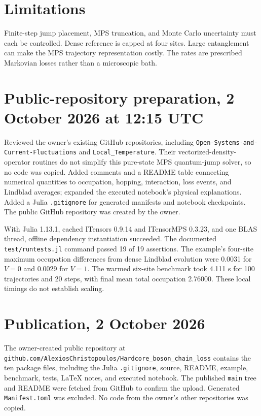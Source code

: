 \documentclass[11pt]{article}
\begin{document}
\section*{Limitations}
Finite-step jump placement, MPS truncation, and Monte Carlo uncertainty
must each be controlled. Dense reference is capped at four sites.
Large entanglement can make the MPS trajectory representation costly.
The rates are prescribed Markovian losses rather than a microscopic bath.
\section*{Public-repository preparation, 2 October 2026 at 12:15 UTC}
Reviewed the owner's existing GitHub repositories, including
\texttt{Open-Systems-and-Current-Fluctuations} and
\texttt{Local\_Temperature}. Their vectorized-density-operator routines
do not simplify this pure-state MPS quantum-jump solver, so no code was
copied. Added comments and a README table connecting numerical quantities
to occupation, hopping, interaction, loss events, and Lindblad averages;
expanded the executed notebook's physical explanations. Added a Julia
\texttt{.gitignore} for generated manifests and notebook checkpoints.
The public GitHub repository was created by the owner.

With Julia 1.13.1, cached ITensors 0.9.14 and ITensorMPS 0.3.23, and one
BLAS thread, offline dependency instantiation succeeded. The documented
\texttt{test/runtests.jl} command passed 19 of 19 assertions. The example's
four-site maximum occupation differences from dense Lindblad evolution
were 0.0031 for $V=0$ and 0.0029 for $V=1$. The warmed six-site benchmark
took 4.111 s for 100 trajectories and 20 steps, with final mean total
occupation 2.76000. These local timings do not establish scaling.
\section*{Publication, 2 October 2026}
The owner-created public repository at
\texttt{github.com/AlexiosChristopoulos/Hardcore\_boson\_chain\_loss}
contains the ten package files, including the Julia \texttt{.gitignore},
source, README, example, benchmark, tests, LaTeX notes, and executed
notebook. The published \texttt{main} tree and README were fetched from
GitHub to confirm the upload. Generated \texttt{Manifest.toml} was
excluded. No code from the owner's other repositories was copied.
\end{document}
